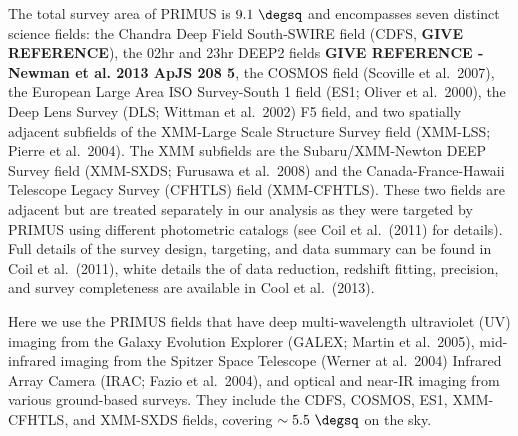 The total survey area of PRIMUS is $9.1~\degsq$ and encompasses seven distinct science fields: the Chandra Deep Field South-SWIRE field (CDFS, {\bf GIVE REFERENCE}), the 02hr and 23hr DEEP2 fields {\bf GIVE REFERENCE - Newman et al. 2013 ApJS 208 5}, the COSMOS field (Scoville et al.~2007), the European Large Area ISO Survey-South 1 field (ES1; Oliver et al.~2000), the Deep Lens Survey (DLS; Wittman et al.~2002) F5 field, and two spatially adjacent subfields of the XMM-Large Scale Structure Survey field (XMM-LSS; Pierre et al.~2004). The XMM subfields are the Subaru/XMM-Newton DEEP Survey field (XMM-SXDS; Furusawa et al.~2008) and the Canada-France-Hawaii Telescope Legacy Survey (CFHTLS) field (XMM-CFHTLS).
These two fields are adjacent but are treated separately in our analysis 
as they were targeted by PRIMUS using different photometric catalogs (see Coil et al.~(2011) for details).
Full details of the survey design, targeting, and data summary can be found in Coil et al.~(2011), white details the of data reduction, redshift fitting, precision, and survey completeness are available in Cool et al.~(2013).

Here we use the PRIMUS fields that have deep multi-wavelength ultraviolet (UV) imaging from the Galaxy Evolution Explorer (GALEX; Martin et al.~2005), mid-infrared imaging from the Spitzer Space Telescope (Werner at al.~2004) Infrared Array Camera (IRAC; Fazio et al.~2004), and optical and near-IR imaging from various ground-based surveys.
They include the CDFS, COSMOS, ES1, XMM-CFHTLS, and XMM-SXDS fields, covering ${\sim 5.5~\degsq}$ on the sky.

